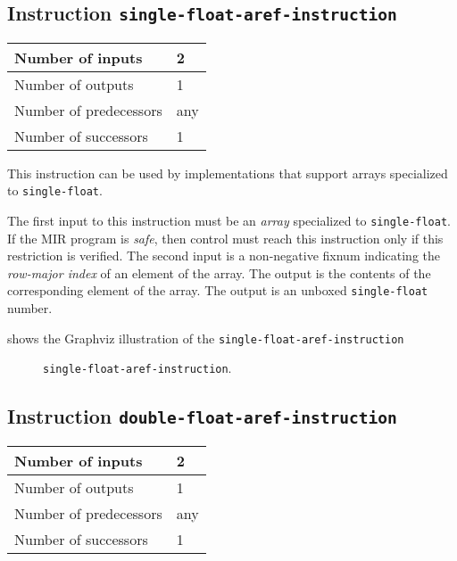 \subsection{Instruction \texttt{single-float-aref-instruction}}
\label{mir-instruction-single-float-aref}

\begin{tabular}{|l|l|}
\hline
Number of inputs & 2\\
\hline
Number of outputs & 1\\
\hline
Number of predecessors & any\\
\hline
Number of successors & 1\\
\hline
\end{tabular}

This instruction can be used by implementations that support arrays
specialized to \texttt{single-float}.

The first input to this instruction must be an \emph{array}
specialized to \texttt{single-float}.  If the MIR program is
\emph{safe}, then control must reach this instruction only if this
restriction is verified.  The second input is a non-negative fixnum
indicating the \emph{row-major index} of an element of the array.  The
output is the contents of the corresponding element of the array.  The
output is an unboxed \texttt{single-float} number.

 shows the Graphviz illustration of the
\texttt{single-float-aref-instruction}

\begin{figure}
\begin{center}
\end{center}
\caption{\label{fig-single-float-aref-instruction}
\texttt{single-float-aref-instruction}.}
\end{figure}

\subsection{Instruction \texttt{double-float-aref-instruction}}
\label{mir-instruction-double-float-aref}

\begin{tabular}{|l|l|}
\hline
Number of inputs & 2\\
\hline
Number of outputs & 1\\
\hline
Number of predecessors & any\\
\hline
Number of successors & 1\\
\hline
\end{tabular}

